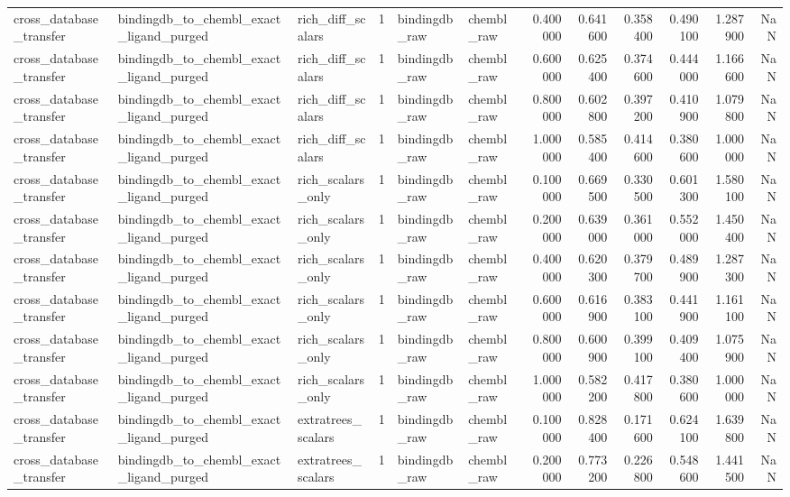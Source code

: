 \begin{longtable}{lllrllrrrrrr}
cross\_database\_transfer & bindingdb\_to\_chembl\_exact\_ligand\_purged & rich\_diff\_scalars & 1 & bindingdb\_raw & chembl\_raw & 0.400000 & 0.641600 & 0.358400 & 0.490100 & 1.287900 & NaN \\
cross\_database\_transfer & bindingdb\_to\_chembl\_exact\_ligand\_purged & rich\_diff\_scalars & 1 & bindingdb\_raw & chembl\_raw & 0.600000 & 0.625400 & 0.374600 & 0.444000 & 1.166600 & NaN \\
cross\_database\_transfer & bindingdb\_to\_chembl\_exact\_ligand\_purged & rich\_diff\_scalars & 1 & bindingdb\_raw & chembl\_raw & 0.800000 & 0.602800 & 0.397200 & 0.410900 & 1.079800 & NaN \\
cross\_database\_transfer & bindingdb\_to\_chembl\_exact\_ligand\_purged & rich\_diff\_scalars & 1 & bindingdb\_raw & chembl\_raw & 1.000000 & 0.585400 & 0.414600 & 0.380600 & 1.000000 & NaN \\
cross\_database\_transfer & bindingdb\_to\_chembl\_exact\_ligand\_purged & rich\_scalars\_only & 1 & bindingdb\_raw & chembl\_raw & 0.100000 & 0.669500 & 0.330500 & 0.601300 & 1.580100 & NaN \\
cross\_database\_transfer & bindingdb\_to\_chembl\_exact\_ligand\_purged & rich\_scalars\_only & 1 & bindingdb\_raw & chembl\_raw & 0.200000 & 0.639000 & 0.361000 & 0.552000 & 1.450400 & NaN \\
cross\_database\_transfer & bindingdb\_to\_chembl\_exact\_ligand\_purged & rich\_scalars\_only & 1 & bindingdb\_raw & chembl\_raw & 0.400000 & 0.620300 & 0.379700 & 0.489900 & 1.287300 & NaN \\
cross\_database\_transfer & bindingdb\_to\_chembl\_exact\_ligand\_purged & rich\_scalars\_only & 1 & bindingdb\_raw & chembl\_raw & 0.600000 & 0.616900 & 0.383100 & 0.441900 & 1.161100 & NaN \\
cross\_database\_transfer & bindingdb\_to\_chembl\_exact\_ligand\_purged & rich\_scalars\_only & 1 & bindingdb\_raw & chembl\_raw & 0.800000 & 0.600900 & 0.399100 & 0.409400 & 1.075900 & NaN \\
cross\_database\_transfer & bindingdb\_to\_chembl\_exact\_ligand\_purged & rich\_scalars\_only & 1 & bindingdb\_raw & chembl\_raw & 1.000000 & 0.582200 & 0.417800 & 0.380600 & 1.000000 & NaN \\
cross\_database\_transfer & bindingdb\_to\_chembl\_exact\_ligand\_purged & extratrees\_scalars & 1 & bindingdb\_raw & chembl\_raw & 0.100000 & 0.828400 & 0.171600 & 0.624100 & 1.639800 & NaN \\
cross\_database\_transfer & bindingdb\_to\_chembl\_exact\_ligand\_purged & extratrees\_scalars & 1 & bindingdb\_raw & chembl\_raw & 0.200000 & 0.773200 & 0.226800 & 0.548600 & 1.441500 & NaN \\

\end{longtable}

